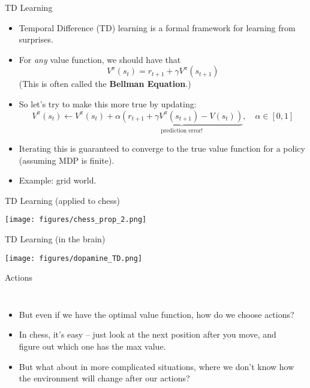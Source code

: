 \documentclass[handout]{beamer} %
\begin{document}
\begin{frame}{TD Learning}
\begin{itemize}
    \item<1-> Temporal Difference (TD) learning is a formal framework for learning from surprises. 
    \item<2-> For \emph{any} value function, we should have that
        \[V^{\pi}(s_{t}) = r_{t+1} + \gamma V^{\pi}(s_{t+1})\] 
        (This is often called the \textbf{Bellman Equation}.)
    \item<3-> So let's try to make this more true by updating: 
        \[V^{\pi}(s_t) \leftarrow V^{\pi}(s_t) + \alpha \underbrace{\left( r_{t+1} + \gamma V^{\pi}(s_{t+1}) - V(s_t)\right)}_{\text{prediction error!}}, \quad \alpha \in [0, 1]\]
    \item<4-> Iterating this is guaranteed to converge to the true value function for a policy (assuming MDP is finite).
    \item<5-> Example: grid world.
\end{itemize}
\end{frame}

\begin{frame}{TD Learning (applied to chess)}
\begin{center}
%
%
\texttt{[image: figures/chess\_prop\_2.png]}
\end{center}
\end{frame}

\begin{frame}{TD Learning (in the brain)}

\begin{center}
\texttt{[image: figures/dopamine\_TD.png]}
\end{center}
\end{frame}

\begin{frame}{Actions}
\begin{columns}
\begin{itemize}
    \item<1-> But even if we have the optimal value function, how do we choose actions? 
    \item<2-> In chess, it's easy -- just look at the next position after you move, and figure out which one has the max value.
    \item<3-> But what about in more complicated situations, where we don't know how the environment will change after our actions?
\end{itemize}
    \begin{center}
    \end{center}
\end{columns}
\end{frame}
\end{document}
